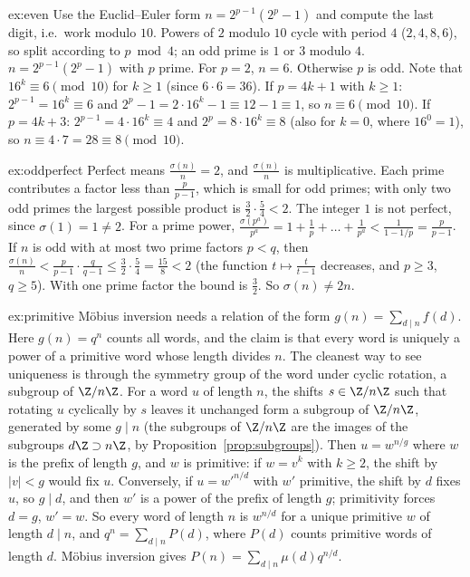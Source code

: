 \begin{solution}{ex:even}
\idea Use the Euclid--Euler form $n=2^{p-1}(2^p-1)$ and compute the last digit, i.e.\ work modulo $10$. Powers of $2$ modulo $10$ cycle with period $4$ ($2,4,8,6$), so split according to $p\bmod4$; an odd prime is $1$ or $3$ modulo $4$.
\writeup $n=2^{p-1}(2^p-1)$ with $p$ prime. For $p=2$, $n=6$. Otherwise $p$ is odd. Note that $16^k\equiv6\pmod{10}$ for $k\ge1$ (since $6\cdot6=36$).
If $p=4k+1$ with $k\ge1$: $2^{p-1}=16^k\equiv6$ and $2^p-1=2\cdot16^k-1\equiv12-1\equiv1$, so $n\equiv6\pmod{10}$.
If $p=4k+3$: $2^{p-1}=4\cdot16^k\equiv4$ and $2^p=8\cdot16^k\equiv8$ (also for $k=0$, where $16^0=1$), so $n\equiv4\cdot7=28\equiv8\pmod{10}$.
\end{solution}

\begin{solution}{ex:oddperfect}
\idea Perfect means $\frac{\sigma(n)}n=2$, and $\frac{\sigma(n)}n$ is multiplicative. Each prime contributes a factor less than $\frac p{p-1}$, which is small for odd primes; with only two odd primes the largest possible product is $\frac32\cdot\frac54<2$.
\writeup The integer $1$ is not perfect, since $\sigma(1)=1\ne2$. For a prime power, $\frac{\sigma(p^a)}{p^a}=1+\frac1p+\dots+\frac1{p^a}<\frac1{1-1/p}=\frac p{p-1}$. If $n$ is odd with at most two prime factors $p<q$, then $\frac{\sigma(n)}n<\frac p{p-1}\cdot\frac q{q-1}\le\frac32\cdot\frac54=\frac{15}8<2$ (the function $t\mapsto\frac t{t-1}$ decreases, and $p\ge3$, $q\ge5$). With one prime factor the bound is $\frac32$. So $\sigma(n)\ne2n$.
\end{solution}

\begin{solution}{ex:primitive}
\idea M\"obius inversion needs a relation of the form $g(n)=\sum_{d\mid n}f(d)$. Here $g(n)=q^n$ counts all words, and the claim is that every word is uniquely a power of a primitive word whose length divides $n$. The cleanest way to see uniqueness is through the symmetry group of the word under cyclic rotation, a subgroup of $\Z/n\Z$.
\writeup For a word $u$ of length $n$, the shifts $s\in\Z/n\Z$ such that rotating $u$ cyclically by $s$ leaves it unchanged form a subgroup of $\Z/n\Z$, generated by some $g\mid n$ (the subgroups of $\Z/n\Z$ are the images of the subgroups $d\Z\supset n\Z$, by Proposition~\ref{prop:subgroups}). Then $u=w^{n/g}$ where $w$ is the prefix of length $g$, and $w$ is primitive: if $w=v^k$ with $k\ge2$, the shift by $|v|<g$ would fix $u$.
Conversely, if $u=w'^{n/d}$ with $w'$ primitive, the shift by $d$ fixes $u$, so $g\mid d$, and then $w'$ is a power of the prefix of length $g$; primitivity forces $d=g$, $w'=w$. So every word of length $n$ is $w^{n/d}$ for a unique primitive $w$ of length $d\mid n$, and $q^n=\sum_{d\mid n}P(d)$, where $P(d)$ counts primitive words of length $d$. M\"obius inversion gives $P(n)=\sum_{d\mid n}\mu(d)q^{n/d}$.
\end{solution}

